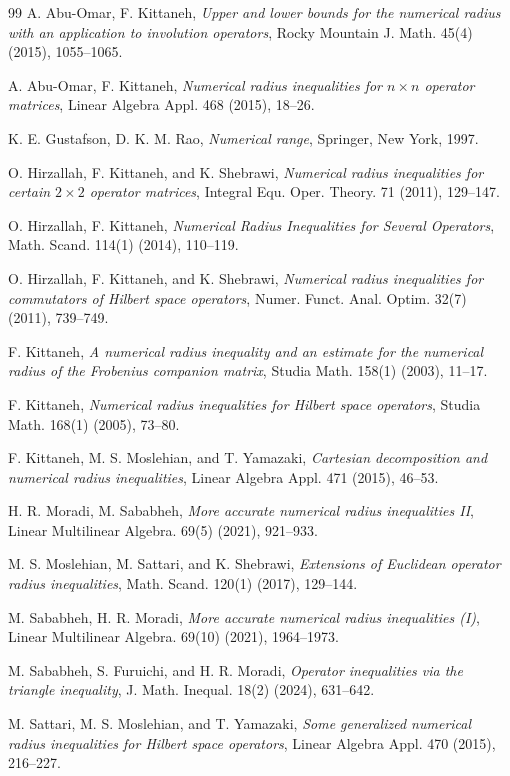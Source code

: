 \documentclass[12pt,twoside,reqno]{amsart}
\numberwithin{equation}{section}
\begin{document}
\begin{thebibliography}{99}
A. Abu-Omar, F. Kittaneh, {\it Upper and lower bounds for the numerical radius with an application to involution operators}, Rocky Mountain J. Math. {45}(4) (2015), 1055--1065.

A. Abu-Omar, F. Kittaneh, {\it Numerical radius inequalities for $n\times n$ operator matrices}, Linear Algebra Appl. 468 (2015), 18--26.

K. E. Gustafson, D. K. M. Rao, {\it Numerical range}, Springer, New York, 1997.

O. Hirzallah, F. Kittaneh, and K. Shebrawi, {\it Numerical radius inequalities for certain $2 \times 2$ operator matrices}, Integral Equ. Oper. Theory. {71} (2011), 129--147. 

O. Hirzallah, F. Kittaneh,  {\it Numerical Radius Inequalities for Several Operators}, Math. Scand. 114(1) (2014), 110--119.

O. Hirzallah, F. Kittaneh, and K. Shebrawi, {\it Numerical radius inequalities for commutators of Hilbert space operators}, Numer. Funct. Anal. Optim. 32(7) (2011), 739--749.

F. Kittaneh, {\it A numerical radius inequality and an estimate for the numerical radius of the Frobenius companion matrix}, Studia Math. {158}(1) (2003), 11--17.

F. Kittaneh, {\it Numerical radius inequalities for Hilbert space operators}, Studia Math. {168}(1) (2005), 73--80.

F. Kittaneh, M. S. Moslehian, and T. Yamazaki, {\it Cartesian decomposition and numerical radius inequalities}, Linear Algebra Appl. {471} (2015), 46--53. 

H. R. Moradi, M. Sababheh,  {\it More accurate numerical radius inequalities II}, Linear Multilinear Algebra. {69}(5) (2021), 921--933.

M. S. Moslehian, M. Sattari, and K. Shebrawi, {\it Extensions of Euclidean operator radius inequalities}, Math. Scand. {120}(1) (2017), 129--144.

M. Sababheh, H. R. Moradi, \textit{More accurate numerical radius inequalities (I)}, Linear Multilinear Algebra. {69}(10) (2021), 1964--1973.

M. Sababheh, S. Furuichi, and H. R. Moradi, {\it Operator inequalities via the triangle inequality}, J. Math. Inequal. 18(2) (2024), 631--642.

M. Sattari, M. S. Moslehian, and T. Yamazaki, {\it Some generalized numerical radius inequalities for Hilbert space operators}, Linear Algebra Appl. {470} (2015), 216--227.


\end{thebibliography}
\end{document}
